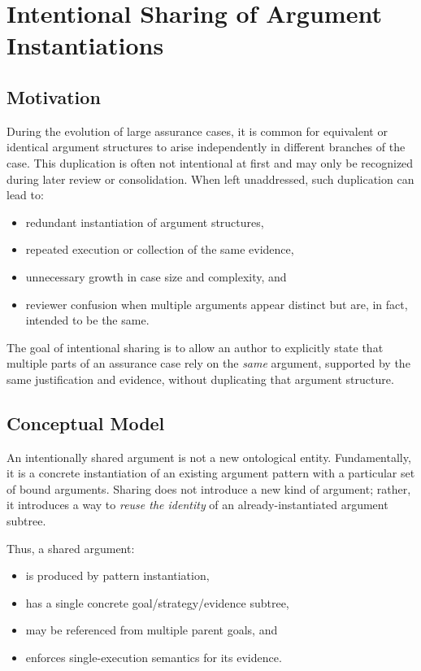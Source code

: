 \documentclass[12pt,twoside,a4paper]{article}
\begin{document}
\section{Intentional Sharing of Argument Instantiations}
\label{sec:shared-argument-instantiations}

\subsection{Motivation}

During the evolution of large assurance cases, it is common for equivalent or identical argument structures to arise independently in different branches of the case. This duplication is often not intentional at first and may only be recognized during later review or consolidation. When left unaddressed, such duplication can lead to:

\begin{itemize}
  \item redundant instantiation of argument structures,
  \item repeated execution or collection of the same evidence,
  \item unnecessary growth in case size and complexity, and
  \item reviewer confusion when multiple arguments appear distinct but are, in fact, intended to be the same.
\end{itemize}

The goal of intentional sharing is to allow an author to explicitly state that multiple parts of an assurance case rely on the \emph{same} argument, supported by the same justification and evidence, without duplicating that argument structure.

\subsection{Conceptual Model}

An intentionally shared argument is not a new ontological entity. Fundamentally, it is a concrete instantiation of an existing argument pattern with a particular set of bound arguments. Sharing does not introduce a new kind of argument; rather, it introduces a way to \emph{reuse the identity} of an already-instantiated argument subtree.

Thus, a shared argument:
\begin{itemize}
  \item is produced by pattern instantiation,
  \item has a single concrete goal/strategy/evidence subtree,
  \item may be referenced from multiple parent goals, and
  \item enforces single-execution semantics for its evidence.
\end{itemize}
\end{document}
